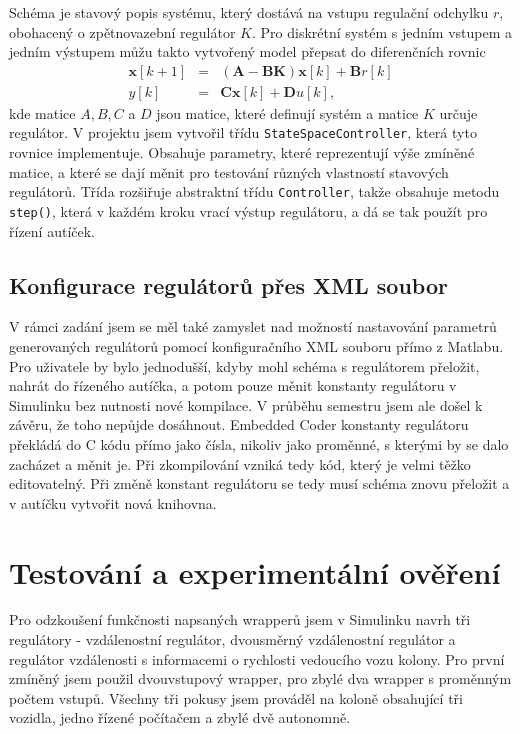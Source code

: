 \documentclass[thesis=M,czech,hidelinks]{FITthesis}[2012/06/26]
\begin{document}
Schéma je stavový popis systému, který dostává na vstupu regulační odchylku $r$, obohacený o zpětnovazební regulátor $K$. Pro diskrétní systém s jedním vstupem a jedním výstupem můžu takto vytvořený model přepsat do diferenčních rovnic
\begin{eqnarray}
\textbf{x}[k+1]&=& (\textbf{A}-\textbf{BK})\textbf{x}[k]+\textbf{B}r[k] \\ \nonumber
y[k] &=& \textbf{Cx}[k]+\textbf{D}u[k],
\end{eqnarray}
kde matice $A,B,C$ a $D$ jsou matice, které definují systém a matice $K$ určuje regulátor. V projektu jsem vytvořil třídu \texttt{StateSpaceController}, která tyto rovnice implementuje. Obsahuje parametry, které reprezentují výše zmíněné matice, a které se dají měnit pro testování různých vlastností stavových regulátorů. Třída rozšiřuje abstraktní třídu \texttt{Controller}, takže obsahuje metodu \texttt{step()}, která v každém kroku vrací výstup regulátoru, a dá se tak použít pro řízení autíček.

\section{Konfigurace regulátorů přes XML soubor}
V rámci zadání jsem se měl také zamyslet nad možností nastavování parametrů generovaných regulátorů pomocí konfiguračního XML souboru přímo z Matlabu. Pro uživatele by bylo jednodušší, kdyby mohl schéma s regulátorem přeložit, nahrát do řízeného autíčka, a potom pouze měnit konstanty regulátoru v Simulinku bez nutnosti nové kompilace. V průběhu semestru jsem ale došel k závěru, že toho nepůjde dosáhnout. Embedded Coder konstanty regulátoru překládá do C kódu přímo jako čísla, nikoliv jako proměnné, s kterými by se dalo zacházet a měnit je. Při zkompilování vzniká tedy kód, který je velmi těžko editovatelný. Při změně konstant regulátoru se tedy musí schéma znovu přeložit a v autíčku vytvořit nová knihovna.

\chapter{Testování a experimentální ověření}

Pro odzkoušení funkčnosti napsaných wrapperů jsem v Simulinku navrh tři regulátory - vzdálenostní regulátor, dvousměrný vzdálenostní regulátor a regulátor vzdálenosti s informacemi o rychlosti vedoucího vozu kolony. Pro první zmíněný jsem použil dvouvstupový wrapper, pro zbylé dva wrapper s proměnným počtem vstupů. Všechny tři pokusy jsem prováděl na koloně obsahující tři vozidla, jedno řízené počítačem a zbylé dvě autonomně.
\end{document}
